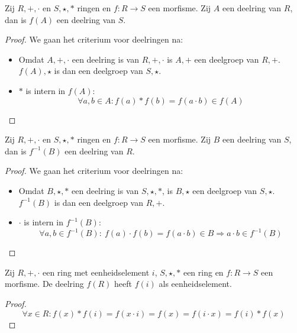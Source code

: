 \documentclass[main.tex]{subfiles}
\begin{document}
\begin{ei}
  Zij $R,+,\cdot$ en $S,\star,*$ ringen en $f:R \rightarrow S$ een morfisme.
  Zij $A$ een deelring van $R$, dan is $f(A)$ een deelring van $S$.

  \begin{proof}
    We gaan het criterium voor deelringen na:
    \begin{itemize}
    \item Omdat $A,+,\cdot$ een deelring is van $R,+,\cdot$ is $A,+$ een deelgroep van $R,+$.
      $f(A),\star$ is dan een deelgroep van $S,\star$.
    \item $*$ is intern in $f(A)$:
      \[ \forall a,b \in A: f(a) * f(b) = f(a\cdot b) \in f(A) \]
    \end{itemize}
  \end{proof}
\end{ei}

\begin{ei}
  Zij $R,+,\cdot$ en $S,\star,*$ ringen en $f:R \rightarrow S$ een morfisme.
  Zij $B$ een deelring van $S$, dan is $f^{-1}(B)$ een deelring van $R$.

  \begin{proof}
    We gaan het criterium voor deelringen na:
    \begin{itemize}
    \item Omdat $B,\star,*$ een deelring is van $S,\star,*$, is $B,\star$ een deelgroep van $S,\star$.
      $f^{-1}(B)$ is dan een deelgroep van $R,+$. 
    \item $\cdot$ is intern in $f^{-1}(B)$:
      \[ \forall a,b \in f^{-1}(B):\ f(a) \cdot f(b) = f(a \cdot b) \in B \Rightarrow a \cdot b \in f^{-1}(B) \]
    \end{itemize}
  \end{proof}
\end{ei}

\begin{ei}
  Zij $R,+,\cdot$ een ring met eenheidselement $i$, $S,\star,*$ een ring en $f:R \rightarrow S$ een morfisme.
  De deelring $f(R)$ heeft $f(i)$ als eenheidselement.

  \begin{proof}
    \[ \forall x\in R: f(x) *f(i) = f(x \cdot i) = f(x) = f(i \cdot x) = f(i) * f(x) \]
  \end{proof}
\end{ei}
\end{document}
